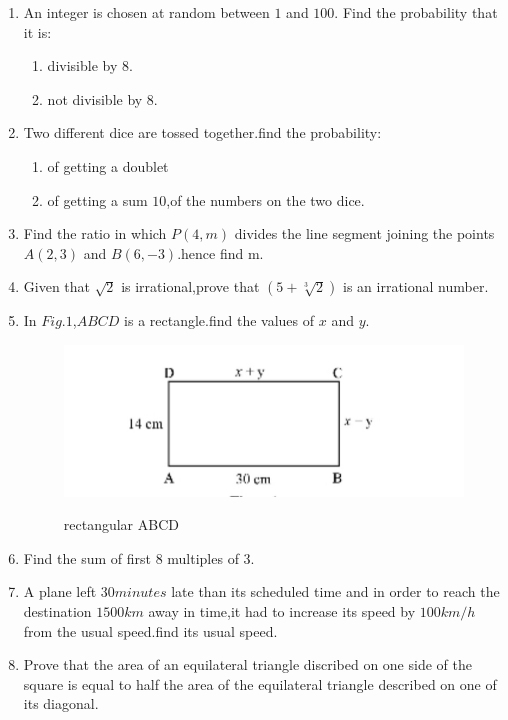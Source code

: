 \documentclass{article}
\begin{document}
\begin{enumerate}
\item An integer is chosen at random between $1$ and $100$. Find the probability that it is:
	\begin{enumerate}[label=\roman*)]
		\item divisible by $8$.
		\item not divisible by $8$.
	\end{enumerate}
\item Two different dice are tossed together.find the probability:
	\begin{enumerate}[label=\roman*)]
		\item of getting a doublet
		\item of getting a sum $10$,of the numbers on the two dice.
	\end{enumerate}
\item Find the ratio in which $P(4,m)$ divides the line segment joining the points $A(2,3)$ and $B(6,-3)$.hence find m.
\item Given that $\sqrt{2}$ is irrational,prove that $(5+\sqrt[3]{2})$ is an irrational number.
\item In $Fig.1$,$ABCD$ is a rectangle.find the values of $x$ and $y$. \\
	\begin{figure}[H]
	\centering
	\includegraphics [width=\columnwidth] {./IMAGE3.jpg}
	\label{fig:fig1}
	\caption{rectangular ABCD}
	\end{figure}
\item Find the sum of first $8$ multiples of $3$.
\item A plane left $30 minutes$ late than its scheduled time and in order to reach the destination $1500km$ away in time,it had to increase its speed by $100km/h$ from the usual speed.find its usual speed.
\item Prove that the area of an equilateral triangle discribed on one side of the square is equal to half the area of the equilateral triangle described on one of its diagonal.\\
	

\end{enumerate}
\end{document}
